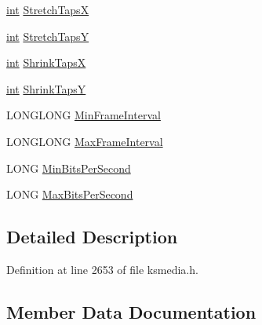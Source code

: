 \begin{DoxyCompactItemize}
\item 
\hyperlink{xmltok_8h_a5a0d4a5641ce434f1d23533f2b2e6653}{int} \hyperlink{struct___k_s___v_i_d_e_o___s_t_r_e_a_m___c_o_n_f_i_g___c_a_p_s_a3d2be8443d151a3634cab04071cc83a0}{Stretch\+TapsX}
\item 
\hyperlink{xmltok_8h_a5a0d4a5641ce434f1d23533f2b2e6653}{int} \hyperlink{struct___k_s___v_i_d_e_o___s_t_r_e_a_m___c_o_n_f_i_g___c_a_p_s_a250a608ed82cdf42941bfd135bffe258}{Stretch\+TapsY}
\item 
\hyperlink{xmltok_8h_a5a0d4a5641ce434f1d23533f2b2e6653}{int} \hyperlink{struct___k_s___v_i_d_e_o___s_t_r_e_a_m___c_o_n_f_i_g___c_a_p_s_adc4398e2349022c836b5fc01b4879040}{Shrink\+TapsX}
\item 
\hyperlink{xmltok_8h_a5a0d4a5641ce434f1d23533f2b2e6653}{int} \hyperlink{struct___k_s___v_i_d_e_o___s_t_r_e_a_m___c_o_n_f_i_g___c_a_p_s_a9fa2d1637361961979966e1ee6d4a062}{Shrink\+TapsY}
\item 
L\+O\+N\+G\+L\+O\+NG \hyperlink{struct___k_s___v_i_d_e_o___s_t_r_e_a_m___c_o_n_f_i_g___c_a_p_s_aee7856211889b3e991f79161adb4531c}{Min\+Frame\+Interval}
\item 
L\+O\+N\+G\+L\+O\+NG \hyperlink{struct___k_s___v_i_d_e_o___s_t_r_e_a_m___c_o_n_f_i_g___c_a_p_s_a6947276038b68b07d479d70b3d7f0bd4}{Max\+Frame\+Interval}
\item 
L\+O\+NG \hyperlink{struct___k_s___v_i_d_e_o___s_t_r_e_a_m___c_o_n_f_i_g___c_a_p_s_ae5da4bdac7935e547ff32c7d8e17b956}{Min\+Bits\+Per\+Second}
\item 
L\+O\+NG \hyperlink{struct___k_s___v_i_d_e_o___s_t_r_e_a_m___c_o_n_f_i_g___c_a_p_s_a87aef5b8b5161dbea42443193e5c1922}{Max\+Bits\+Per\+Second}
\end{DoxyCompactItemize}


\subsection{Detailed Description}


Definition at line 2653 of file ksmedia.\+h.



\subsection{Member Data Documentation}
